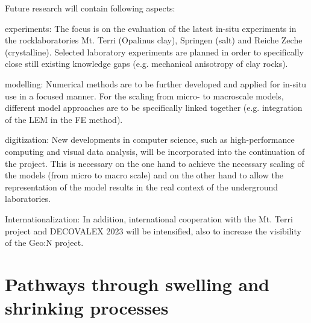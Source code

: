 Future research will contain following aspects:
\begin{list}{--}{\leftmargin=1em \itemindent=0em \itemsep=-0.5em}
\item experiments: The focus is on the evaluation of the latest in-situ experiments in the rock\-laboratories Mt. Terri (Opalinus clay), Springen (salt) and Reiche Zeche (crystalline). Selected laboratory experiments are planned in order to specifically close still existing knowledge gaps (e.g. mechanical anisotropy of clay rocks).
\item modelling: Numerical methods are to be further developed and applied for in-situ use in a focused manner. For the scaling from micro- to macroscale models, different model approaches are to be specifically linked together (e.g. integration of the LEM in the FE method).
\item digitization: New developments in computer science, such as high-performance computing and visual data analysis, will be incorporated into the continuation of the project. This is necessary on the one hand to achieve the necessary scaling of the models (from micro to macro scale) and on the other hand to allow the representation of the model results in the real context of the underground laboratories.
\item Internationalization: In addition, international cooperation with the Mt. Terri project and DECOVALEX 2023 will be intensified, also to increase the visibility of the Geo:N project.
\end{list}

\section{Pathways through swelling and shrinking processes}
\label{sec:wp1-plan}

